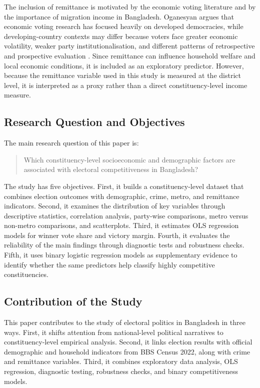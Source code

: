 \documentclass[12pt,a4paper]{article}
\begin{document}
The inclusion of remittance is motivated by the economic voting literature and by the importance of migration income in Bangladesh. Oganesyan argues that economic voting research has focused heavily on developed democracies, while developing-country contexts may differ because voters face greater economic volatility, weaker party institutionalisation, and different patterns of retrospective and prospective evaluation \citep{oganesyan2014}. Since remittance can influence household welfare and local economic conditions, it is included as an exploratory predictor. However, because the remittance variable used in this study is measured at the district level, it is interpreted as a proxy rather than a direct constituency-level income measure.

\subsection{Research Question and Objectives}

The main research question of this paper is:

\begin{quote}
Which constituency-level socioeconomic and demographic factors are associated with electoral competitiveness in Bangladesh?
\end{quote}

The study has five objectives. First, it builds a constituency-level dataset that combines election outcomes with demographic, crime, metro, and remittance indicators. Second, it examines the distribution of key variables through descriptive statistics, correlation analysis, party-wise comparisons, metro versus non-metro comparisons, and scatterplots. Third, it estimates OLS regression models for winner vote share and victory margin. Fourth, it evaluates the reliability of the main findings through diagnostic tests and robustness checks. Fifth, it uses binary logistic regression models as supplementary evidence to identify whether the same predictors help classify highly competitive constituencies.

\subsection{Contribution of the Study}

This paper contributes to the study of electoral politics in Bangladesh in three ways. First, it shifts attention from national-level political narratives to constituency-level empirical analysis. Second, it links election results with official demographic and household indicators from BBS Census 2022, along with crime and remittance variables. Third, it combines exploratory data analysis, OLS regression, diagnostic testing, robustness checks, and binary competitiveness models.
\end{document}
